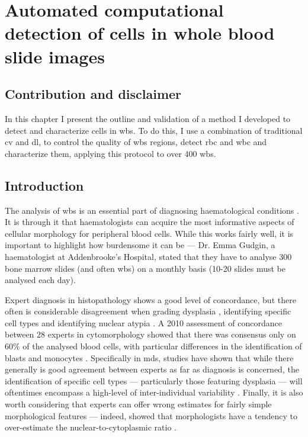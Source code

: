 \chapter{Automated computational detection of cells in whole blood slide images}

\section{Contribution and disclaimer}

In this chapter I present the outline and validation of a method I developed to detect and characterize cells in \ac{wbs}. To do this, I use a combination of traditional \ac{cv} and \ac{dl}, to control the quality of \ac{wbs} regions, detect \ac{rbc} and \ac{wbc} and characterize them, applying this protocol to over 400 \ac{wbs}. 

\section{Introduction}

The analysis of \ac{wbs} is an essential part of diagnosing haematological conditions \cite{Bain2014-oc}. It is through it that haematologists can acquire the most informative aspects of cellular morphology for peripheral blood cells. While this works fairly well, it is important to highlight how burdensome it can be --- Dr. Emma Gudgin, a haematologist at Addenbrooke's Hospital, stated that they have to analyse 300 bone marrow slides (and often \ac{wbs}) on a monthly basis (10-20 slides must be analysed each day).

Expert diagnosis in histopathology shows a good level of concordance, but there often is considerable disagreement when grading dysplasia \cite{Azam2021-su}, identifying specific cell types \cite{Goasguen2009-dn,Foucar2020-uz} and identifying nuclear atypia \cite{Azam2021-su,Weinberg2015-ra}. A 2010 assessment of concordance between 28 experts in cytomorphology showed that there was consensus only on 60\% of the analysed blood cells, with particular differences in the identification of blasts and monocytes \cite{Zini2010-kg}. Specifically in \ac{mds}, studies have shown that while there generally is good agreement between experts as far as diagnosis is concerned, the identification of specific cell types --- particularly those featuring dysplasia --- will oftentimes encompass a high-level of inter-individual variability \cite{De_Swart2017-wc,Howe2004-mn}. Finally, it is also worth considering that experts can offer wrong estimates for fairly simple morphological features --- indeed,  showed that morphologists have a tendency to over-estimate the nuclear-to-cytoplasmic ratio \cite{Zhang2016-sv}.

